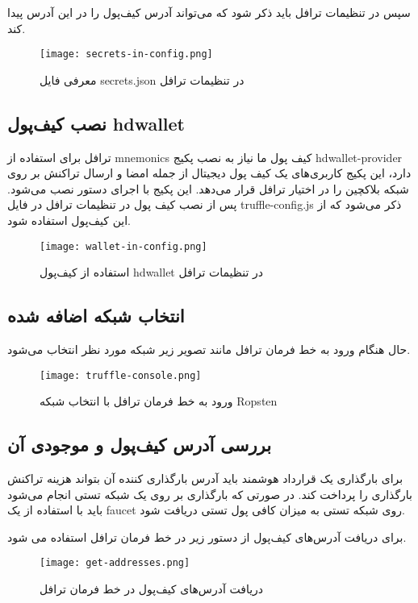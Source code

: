 سپس در تنظیمات ترافل باید ذکر شود که می‌تواند آدرس کیف‌پول را در این آدرس پیدا کند.

\begin{figure}[ht]
\centerline{\texttt{[image: secrets-in-config.png]}}
\caption{معرفی فایل secrets.json در تنظیمات ترافل}
\label{fig:secrets-in-config}
\end{figure}


\subsection{نصب کیف‌پول hdwallet}
ترافل برای استفاده از mnemonics کیف پول ما نیاز به نصب پکیج hdwallet-provider دارد، این پکیج کاربری‌های یک کیف پول دیجیتال از جمله امضا و ارسال تراکنش بر روی شبکه بلاکچین را در اختیار ترافل قرار می‌دهد. این پکیج با اجرای دستور
نصب می‌شود.  پس از نصب کیف پول در تنظیمات ترافل در فایل truffle-config.js ذکر می‌شود که از این کیف‌پول استفاده شود.

\begin{figure}[ht]
\centerline{\texttt{[image: wallet-in-config.png]}}
\caption{استفاده از کیف‌پول hdwallet در تنظیمات ترافل}
\label{fig:wallet-in-config}
\end{figure}


\subsection{انتخاب شبکه اضافه شده}
حال هنگام ورود به خط فرمان ترافل مانند تصویر زیر شبکه مورد نظر انتخاب می‌شود.

\begin{figure}[ht]
\centerline{\texttt{[image: truffle-console.png]}}
\caption{ورود به خط فرمان ترافل با انتخاب شبکه Ropsten}
\label{fig:truffle-console}
\end{figure}


\subsection{بررسی آدرس کیف‌پول و موجودی آن}
برای بارگذاری یک قرارداد هوشمند باید آدرس بارگذاری کننده آن بتواند هزینه تراکنش بارگذاری را پرداخت کند. در صورتی که بارگذاری بر روی یک شبکه تستی انجام می‌شود باید با استفاده از یک faucet روی شبکه تستی به میزان کافی پول تستی دریافت شود.

برای دریافت آدرس‌های کیف‌پول از دستور زیر در خط فرمان ترافل استفاده می شود.

\begin{figure}[ht]
\centerline{\texttt{[image: get-addresses.png]}}
\caption{دریافت آدرس‌های کیف‌پول در خط فرمان ترافل}
\label{fig:get-addresses}
\end{figure}

